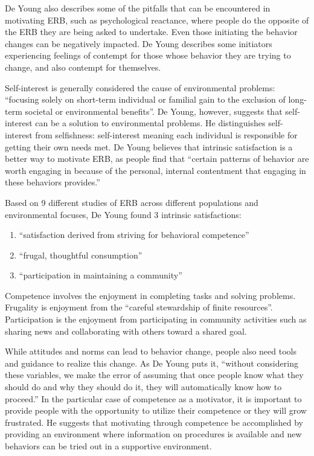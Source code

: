 De Young also describes some of the pitfalls that can be encountered in motivating ERB, such as psychological reactance, where people do the opposite of the ERB they are being asked to undertake. Even those initiating the behavior changes can be negatively impacted. De Young describes some initiators experiencing feelings of contempt for those whose behavior they are trying to change, and also contempt for themselves.

Self-interest is generally considered the cause of environmental problems: ``focusing solely on short-term individual or familial gain to the exclusion of long-term societal or environmental benefits''. De Young, however, suggests that self-interest can be a solution to environmental problems. He distinguishes self-interest from selfishness: self-interest meaning each individual is responsible for getting their own needs met. De Young believes that intrinsic satisfaction is a better way to motivate ERB, as people find that ``certain patterns of behavior are worth engaging in because of the personal, internal contentment that engaging in these behaviors provides.''

Based on 9 different studies of ERB across different populations and environmental focuses, De Young found 3 intrinsic satisfactions:
\begin{enumerate}
	\item ``satisfaction derived from striving for behavioral competence''
	\item ``frugal, thoughtful consumption''
	\item ``participation in maintaining a community''
\end{enumerate}

Competence involves the enjoyment in completing tasks and solving problems. Frugality is enjoyment from the ``careful stewardship of finite resources''. Participation is the enjoyment from participating in community activities such as sharing news and collaborating with others toward a shared goal.

While attitudes and norms can lead to behavior change, people also need tools and guidance to realize this change. As De Young puts it, ``without considering these variables, we make the error of assuming that once people know what they should do and why they should do it, they will automatically know how to proceed.'' In the particular case of competence as a motivator, it is important to provide people with the opportunity to utilize their competence or they will grow frustrated. He suggests that motivating through competence be accomplished by providing an environment where information on procedures is available and new behaviors can be tried out in a supportive environment.

